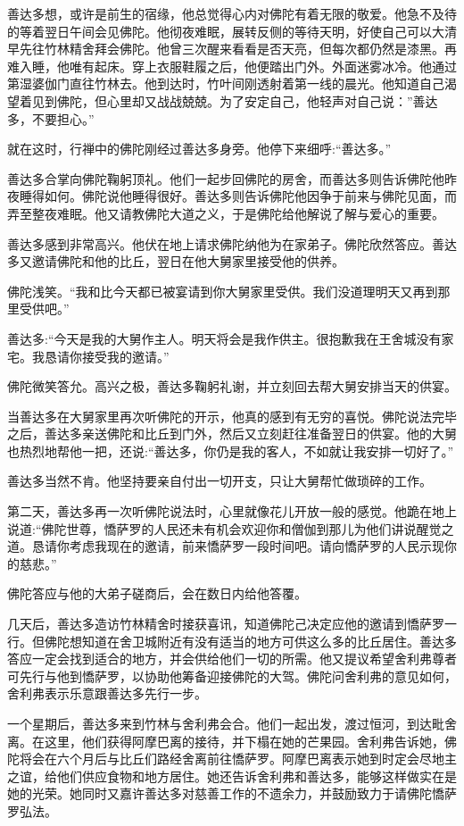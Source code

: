 \documentclass[12pt,twoside,openany]{book}
\begin{document}
善达多想，或许是前生的宿缘，他总觉得心内对佛陀有着无限的敬爱。他急不及待的等着翌日午间会见佛陀。他彻夜难眠，展转反侧的等待天明，好使自己可以大清早先往竹林精舍拜会佛陀。他曾三次醒来看看是否天亮，但每次都仍然是漆黑。再难入睡，他唯有起床。穿上衣服鞋履之后，他便踏出门外。外面迷雾冰冷。他通过第湿婆伽门直往竹林去。他到达时，竹叶间刚透射着第一线的晨光。他知道自己渴望着见到佛陀，但心里却又战战兢兢。为了安定自己，他轻声对自己说：”善达多，不要担心。”

就在这时，行禅中的佛陀刚经过善达多身旁。他停下来细呼:“善达多。”

善达多合掌向佛陀鞠躬顶礼。他们一起步回佛陀的房舍，而善达多则告诉佛陀他昨夜睡得如何。佛陀说他睡得很好。善达多则告诉佛陀他因争于前来与佛陀见面，而弄至整夜难眠。他又请教佛陀大道之义，于是佛陀给他解说了解与爱心的重要。

善达多感到非常高兴。他伏在地上请求佛陀纳他为在家弟子。佛陀欣然答应。善达多又邀请佛陀和他的比丘，翌日在他大舅家里接受他的供养。

佛陀浅笑。“我和比今天都已被宴请到你大舅家里受供。我们没道理明天又再到那里受供吧。”

善达多:“今天是我的大舅作主人。明天将会是我作供主。很抱歉我在王舍城没有家宅。我恳请你接受我的邀请。”

佛陀微笑答允。高兴之极，善达多鞠躬礼谢，并立刻回去帮大舅安排当天的供宴。

当善达多在大舅家里再次听佛陀的开示，他真的感到有无穷的喜悦。佛陀说法完毕之后，善达多亲送佛陀和比丘到门外，然后又立刻赶往准备翌日的供宴。他的大舅也热烈地帮他一把，还说:“善达多，你仍是我的客人，不如就让我安排一切好了。”

善达多当然不肯。他坚持要亲自付出一切开支，只让大舅帮忙做琐碎的工作。

第二天，善达多再一次听佛陀说法时，心里就像花儿开放一般的感觉。他跪在地上说道:“佛陀世尊，憍萨罗的人民还未有机会欢迎你和僧伽到那儿为他们讲说醒觉之道。恳请你考虑我现在的邀请，前来憍萨罗一段时间吧。请向憍萨罗的人民示现你的慈悲。”

佛陀答应与他的大弟子磋商后，会在数日内给他答覆。

几天后，善达多造访竹林精舍时接获喜讯，知道佛陀己决定应他的邀请到憍萨罗一行。但佛陀想知道在舍卫城附近有没有适当的地方可供这么多的比丘居住。善达多答应一定会找到适合的地方，并会供给他们一切的所需。他又提议希望舍利弗尊者可先行与他到憍萨罗，以协助他筹备迎接佛陀的大驾。佛陀问舍利弗的意见如何，舍利弗表示乐意跟善达多先行一步。

一个星期后，善达多来到竹林与舍利弗会合。他们一起出发，渡过恒河，到达毗舍离。在这里，他们获得阿摩巴离的接待，并下榻在她的芒果园。舍利弗告诉她，佛陀将会在六个月后与比丘们路经舍离前往憍萨罗。阿摩巴离表示她到时定会尽地主之谊，给他们供应食物和地方居住。她还告诉舍利弗和善达多，能够这样做实在是她的光荣。她同时又嘉许善达多对慈善工作的不遗余力，并鼓励致力于请佛陀憍萨罗弘法。
\end{document}
